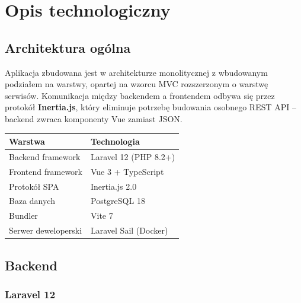 \documentclass[12pt,a4paper]{report}
\begin{document}

\chapter{Opis technologiczny}
\label{ch:technologiczny}

\section{Architektura ogólna}

Aplikacja zbudowana jest w architekturze monolitycznej z wbudowanym podziałem na warstwy, opartej na wzorcu MVC rozszerzonym o warstwę serwisów. Komunikacja między backendem a frontendem odbywa się przez protokół \textbf{Inertia.js}, który eliminuje potrzebę budowania osobnego REST API -- backend zwraca komponenty Vue zamiast JSON.

\begin{center}
\begin{tabular}{|l|l|}
\hline
\textbf{Warstwa}       & \textbf{Technologia}               \\
\hline
Backend framework      & Laravel 12 (PHP 8.2+)              \\
Frontend framework     & Vue 3 + TypeScript                 \\
Protokół SPA           & Inertia.js 2.0                     \\
Baza danych            & PostgreSQL 18                      \\
Bundler                & Vite 7                             \\
Serwer deweloperski    & Laravel Sail (Docker)              \\
\hline
\end{tabular}
\end{center}

\section{Backend}

\subsection{Laravel 12}
\end{document}
